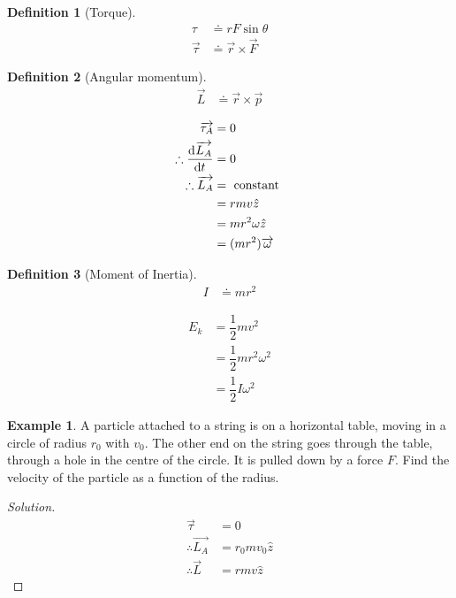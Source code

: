 \documentclass[fleqn, a4paper, 12pt]{amsart}
\theoremstyle{definition}
\newtheorem{example}{Example}
\newtheorem{definition}{Definition}
\theoremstyle{theorem}
\newenvironment{solution}
{\begin{proof}[Solution]\let\qed\relax}
	{\end{proof}}
\begin{document}
\begin{definition}[Torque]
	\begin{align*}
		\tau &\doteq r F \sin \theta\\
		\overrightarrow{\tau} &\doteq \overrightarrow{r} \times \overrightarrow{F}
	\end{align*}
\end{definition}

\begin{definition}[Angular momentum]
	\begin{align*}
		\overrightarrow{L} &\doteq \overrightarrow{r} \times \overrightarrow{p}
	\end{align*}
\end{definition}

\begin{align*}
	\overrightarrow{\tau_A} &= 0\\
	\therefore \dod{\overrightarrow{L_A}}{t} &= 0\\
	\therefore \overrightarrow{L_A} &= \text{ constant }\\
	&= r m v \hat{z}\\
	&= m r^2 \omega \hat{z}\\
	&= (m r^2) \overrightarrow{\omega}
\end{align*}

\begin{definition}[Moment of Inertia]
	\begin{align*}
		I &\doteq m r^2
	\end{align*}
\end{definition}

\begin{align*}
	E_k &= \dfrac{1}{2} m v^2\\
	&= \dfrac{1}{2} m r^2 \omega^2\\
	&= \dfrac{1}{2} I \omega^2
\end{align*}

\begin{example}
	A particle attached to a string is on a horizontal table, moving in a circle of radius $r_0$ with $v_0$. The other end on the string goes through the table, through a hole in the centre of the circle. It is pulled down by a force $F$. Find the velocity of the particle as a function of the radius.
\end{example}

\begin{solution}
	\begin{align*}
		\overrightarrow{\tau} &= 0\\
		\therefore \overrightarrow{L_A} &= r_0 m v_0 \hat{z}\\
		\therefore \overrightarrow{L} &= r m v \hat{z}
	\end{align*}
\end{solution}
\end{document}

